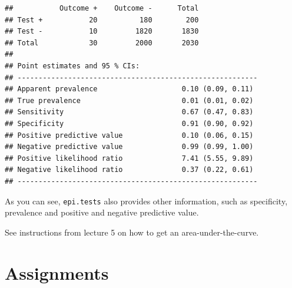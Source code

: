\documentclass[]{book}
\begin{document}
\begin{verbatim}
##           Outcome +    Outcome -      Total
## Test +           20          180        200
## Test -           10         1820       1830
## Total            30         2000       2030
## 
## Point estimates and 95 % CIs:
## ---------------------------------------------------------
## Apparent prevalence                    0.10 (0.09, 0.11)
## True prevalence                        0.01 (0.01, 0.02)
## Sensitivity                            0.67 (0.47, 0.83)
## Specificity                            0.91 (0.90, 0.92)
## Positive predictive value              0.10 (0.06, 0.15)
## Negative predictive value              0.99 (0.99, 1.00)
## Positive likelihood ratio              7.41 (5.55, 9.89)
## Negative likelihood ratio              0.37 (0.22, 0.61)
## ---------------------------------------------------------
\end{verbatim}

As you can see, \texttt{epi.tests} also provides other information, such
as specificity, prevalence and positive and negative predictive value.

See instructions from lecture 5 on how to get an area-under-the-curve.

\hypertarget{assignments-5}{%
\section{Assignments}\label{assignments-5}}
\end{document}
